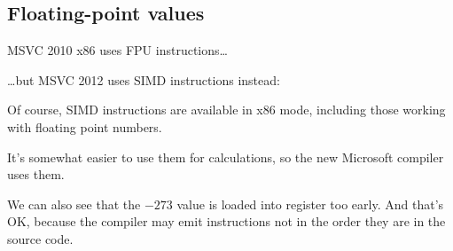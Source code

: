 \subsection{Floating-point values}



MSVC 2010 x86 uses \ac{FPU} instructions\dots



\dots but MSVC  2012 uses \ac{SIMD} instructions instead:



Of course, \ac{SIMD} instructions are available in x86 mode, 
including those working with floating point numbers.

It's somewhat easier to use them for calculations, so the new Microsoft compiler uses them.

We can also see that the $-273$ value 
is loaded into  register too early.
And that's OK, because the compiler may emit instructions not in 
the order they are in the source code.
